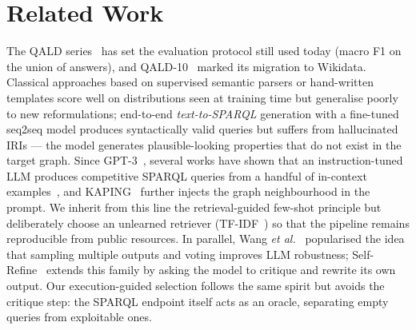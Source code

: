 \documentclass[]{ceurart}
\begin{document}
\section{Related Work}
\label{sec:related}
The QALD series~\cite{usbeck2017qald} has set the evaluation protocol still used today (macro F1 on the union of answers), and QALD-10~\cite{perevalov2022qald10} marked its migration to Wikidata. Classical approaches based on supervised semantic parsers or hand-written templates score well on distributions seen at training time but generalise poorly to new reformulations; end-to-end \emph{text-to-SPARQL} generation with a fine-tuned seq2seq model produces syntactically valid queries but suffers from hallucinated IRIs — the model generates plausible-looking properties that do not exist in the target graph. Since GPT-3~\cite{brown2020gpt3}, several works have shown that an instruction-tuned LLM produces competitive SPARQL queries from a handful of in-context examples~\cite{li2023fewshot}, and KAPING~\cite{baek2023kaping} further injects the graph neighbourhood in the prompt. We inherit from this line the retrieval-guided few-shot principle but deliberately choose an unlearned retriever (TF-IDF~\cite{salton1988term}) so that the pipeline remains reproducible from public resources. In parallel, Wang \emph{et al.}~\cite{wang2022selfconsistency} popularised the idea that sampling multiple outputs and voting improves LLM robustness; Self-Refine~\cite{madaan2023selfrefine} extends this family by asking the model to critique and rewrite its own output. Our execution-guided selection follows the same spirit but avoids the critique step: the SPARQL endpoint itself acts as an oracle, separating empty queries from exploitable ones.

\end{document}
